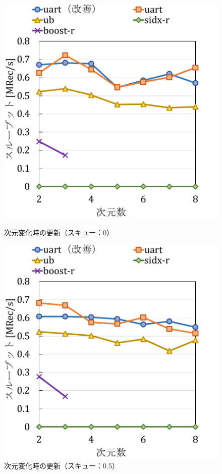 \begin{figure}[tb]
  \begin{minipage}[c]{0.495\textwidth}
    \centering
    \includegraphics[scale=0.5]{./figures/graph-dimention-update-0.pdf}
    \caption{次元変化時の更新（スキュー：0）}
    \label{graph:grouped}
  \end{minipage}
  \begin{minipage}[c]{0.495\textwidth}
    \centering
    \includegraphics[scale=0.5]{./figures/graph-dimention-update-0.5.pdf}
    \caption{次元変化時の更新（スキュー：0.5）}
    \label{graph:paired}
  \end{minipage}
\end{figure}


